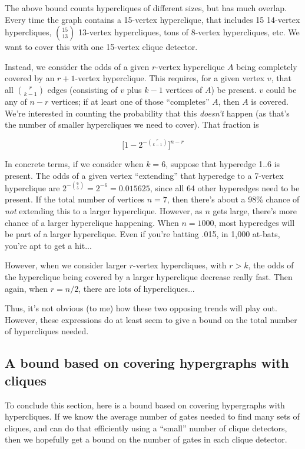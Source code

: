 \documentclass[12pt]{article}
\theoremstyle{definition}
\begin{document}
The above bound counts hypercliques of different sizes, but has much overlap.
Every time the graph contains a 15-vertex hyperclique, that includes
15 14-vertex hypercliques, ${15 \choose 13}$ 13-vertex hypercliques,
tons of 8-vertex hypercliques, etc. We want to
cover this with one 15-vertex clique detector.

Instead, we consider the odds of a given $r$-vertex hyperclique $A$
being completely
covered by an $r+1$-vertex hyperclique. This requires, for a given vertex
$v$, that all ${r \choose {k-1}}$ edges (consisting of $v$ plus $k-1$ vertices
of $A$) be present. $v$ could be any of $n - r$ vertices; if at least one
 of those
``completes'' $A$, then $A$ is covered. We're interested in counting the
probability that this {\em doesn't} happen (as that's the number of smaller
hypercliques we need to cover). That fraction is

\[
\Big[1 - 2^{-{r \choose {k-1}}}\Big]^{n - r}
\]

In concrete terms, if we consider when $k=6$, suppose that hyperedge
1..6 is present.
The odds of a given vertex ``extending'' that hyperedge to a 7-vertex
hyperclique are $2^{-{6 \choose 5}} = 2^{-6} = 0.015625$, since all
64 other hyperedges need to be present. If the total number of vertices $n=7$,
then there's about a 98\% chance of {\em not} extending
this to a larger hyperclique. However, as $n$ gets large, there's more chance
of a larger hyperclique
happening. When $n=1000$, most hyperedges will be part of a larger
hyperclique. Even if you're batting .015, in 1,000 at-bats, you're apt to
get a hit...

However, when we consider larger $r$-vertex hypercliques, with $r > k$,
the odds of the hyperclique being covered by a larger hyperclique decrease
really fast. Then again, when $r = n/2$, there are lots of hypercliques...

Thus, it's not obvious (to me)
how these two opposing trends will play out. However, these
expressions do at least seem to give a bound on the total number of
hypercliques needed.

\subsection{A bound based on covering hypergraphs with cliques}

To conclude this section, here is a bound based on covering hypergraphs
with hypercliques.
If we know the average number of gates needed to find many sets of cliques, and
can do that efficiently using a ``small'' number of clique detectors,
then we hopefully get a bound on the number of gates in each clique detector.
\end{document}
